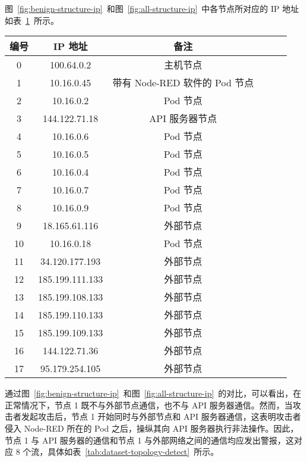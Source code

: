 {\begin{figure}[!htbp]
\end{figure}

图~\ref{fig:benign-structure-ip}~和图~\ref{fig:all-structure-ip}~中各节点所对应的 IP 地址如表~\ref{tab:cross-reference}~所示。

\begin{table}[!htbp]
    \label{tab:cross-reference}
    \centering
    \footnotesize%
    \setlength{\tabcolsep}{4pt}%
    \renewcommand{\arraystretch}{1.2}%
    \begin{tabular}{cccccc}
        \hline
        编号 & IP 地址 & 备注\\
        \hline
        0 & 100.64.0.2 & 主机节点\\
        1 & 10.16.0.45 & 带有 Node-RED 软件的 Pod 节点\\
        2 & 10.16.0.2 & Pod 节点\\
        3 & 144.122.71.18 & API 服务器节点\\
        4 & 10.16.0.6 & Pod 节点\\
        5 & 10.16.0.5 & Pod 节点\\
        6 & 10.16.0.4 & Pod 节点\\
        7 & 10.16.0.7 & Pod 节点\\
        8 & 10.16.0.9 & Pod 节点\\
        9 & 18.165.61.116 & 外部节点\\
        10 & 10.16.0.18 & Pod 节点\\
        11 & 34.120.177.193 & 外部节点\\
        12 & 185.199.111.133 & 外部节点\\
        13 & 185.199.108.133 & 外部节点\\
        14 & 185.199.110.133 & 外部节点\\
        15 & 185.199.109.133 & 外部节点\\
        16 & 144.122.71.36 & 外部节点\\
        17 & 95.179.254.105 & 外部节点\\
        \hline
    \end{tabular}
\end{table}

通过图~\ref{fig:benign-structure-ip}~和图~\ref{fig:all-structure-ip}~的对比，可以看出，在正常情况下，节点 1 既不与外部节点通信，也不与 API 服务器通信。然而，当攻击者发起攻击后，节点 1 开始同时与外部节点和 API 服务器通信，这表明攻击者侵入 Node-RED 所在的 Pod 之后，操纵其向 API 服务器执行非法操作。因此，节点 1 与 API 服务器的通信和节点 1 与外部网络之间的通信均应发出警报，这对应 8 个流，具体如表~\ref{tab:dataset-topology-detect}~所示。

}
